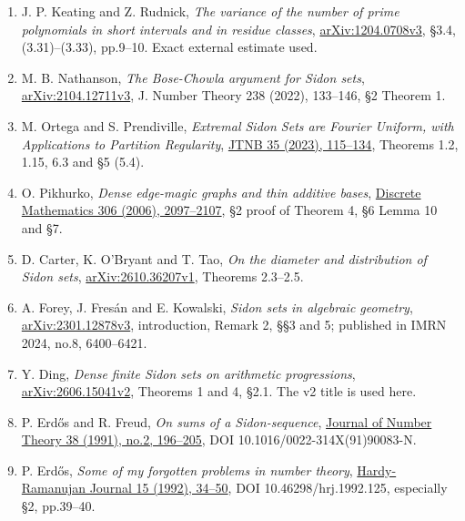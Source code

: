 \documentclass[11pt,a4paper]{article}
\providecommand{\tightlist}{\setlength{\itemsep}{0pt}\setlength{\parskip}{0pt}}
\begin{document}
\begin{enumerate}
\def\labelenumi{\arabic{enumi}.}
\tightlist
\item
  J. P. Keating and Z. Rudnick, \emph{The variance of the number of prime polynomials in short intervals and in residue classes}, \href{https://arxiv.org/pdf/1204.0708v3}{arXiv:1204.0708v3}, §3.4, (3.31)--(3.33), pp.9--10. Exact external estimate used.
\item
  M. B. Nathanson, \emph{The Bose-Chowla argument for Sidon sets}, \href{https://arxiv.org/pdf/2104.12711v3}{arXiv:2104.12711v3}, J. Number Theory 238 (2022), 133--146, §2 Theorem 1.
\item
  M. Ortega and S. Prendiville, \emph{Extremal Sidon Sets are Fourier Uniform, with Applications to Partition Regularity}, \href{https://www.numdam.org/item/10.5802/jtnb.1239.pdf}{JTNB 35 (2023), 115--134}, Theorems 1.2, 1.15, 6.3 and §5 (5.4).
\item
  O. Pikhurko, \emph{Dense edge-magic graphs and thin additive bases}, \href{https://opikhurko.warwick.ac.uk/E/Pikhurko06dm.pdf}{Discrete Mathematics 306 (2006), 2097--2107}, §2 proof of Theorem 4, §6 Lemma 10 and §7.
\item
  D. Carter, K. O'Bryant and T. Tao, \emph{On the diameter and distribution of Sidon sets}, \href{https://arxiv.org/pdf/2610.36207v1}{arXiv:2610.36207v1}, Theorems 2.3--2.5.
\item
  A. Forey, J. Fresán and E. Kowalski, \emph{Sidon sets in algebraic geometry}, \href{https://arxiv.org/pdf/2301.12878v3}{arXiv:2301.12878v3}, introduction, Remark 2, §§3 and 5; published in IMRN 2024, no.8, 6400--6421.
\item
  Y. Ding, \emph{Dense finite Sidon sets on arithmetic progressions}, \href{https://arxiv.org/pdf/2606.15041v2}{arXiv:2606.15041v2}, Theorems 1 and 4, §2.1. The v2 title is used here.
\item
  P. Erdős and R. Freud, \emph{On sums of a Sidon-sequence}, \href{https://www.sciencedirect.com/science/article/pii/0022314X9190083N}{Journal of Number Theory 38 (1991), no.2, 196--205}, DOI 10.1016/0022-314X(91)90083-N.
\item
  P. Erdős, \emph{Some of my forgotten problems in number theory}, \href{https://hrj.episciences.org/125/pdf}{Hardy-Ramanujan Journal 15 (1992), 34--50}, DOI 10.46298/hrj.1992.125, especially §2, pp.39--40.
\end{enumerate}
\end{document}
